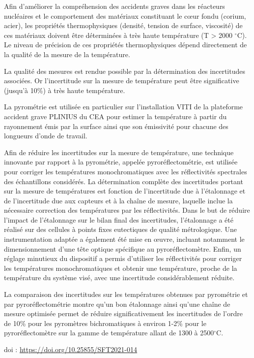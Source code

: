 {\normalsize
Afin d'améliorer la compréhension des accidents graves dans les réacteurs nucléaires et le comportement des matériaux constituant le cœur fondu (corium, acier), les propriétés thermophysiques (densité, tension de surface, viscosité) de ces matériaux doivent être déterminées à très haute température (T > 2000 $^{\circ}$C). Le niveau de précision de ces propriétés thermophysiques dépend directement de la qualité de la mesure de la température.



La qualité des mesures est rendue possible par la détermination des incertitudes associées. Or l'incertitude sur la mesure de température peut être significative (jusqu'à 10\%) à très haute température.



La pyrométrie est utilisée en particulier sur l'installation VITI de la plateforme accident grave PLINIUS du CEA pour estimer la température à partir du rayonnement émis par la surface ainsi que son émissivité pour chacune des longueurs d'onde de travail.



Afin de réduire les incertitudes sur la mesure de température, une technique innovante par rapport à la pyrométrie, appelée pyroréflectométrie, est utilisée pour corriger les températures monochromatiques avec les réflectivités spectrales des échantillons considérés. La détermination complète des incertitudes portant sur la mesure de températures est fonction de l'incertitude due à l'étalonnage et de l'incertitude due aux capteurs et à la chaîne de mesure, laquelle inclue la nécessaire correction des températures par les réflectivités. Dans le but de réduire l'impact de l'étalonnage sur le bilan final des incertitudes, l'étalonnage a été réalisé sur des cellules à points fixes eutectiques de qualité métrologique. Une instrumentation adaptée a également été mise en œuvre, incluant notamment le dimensionnement d'une tête optique spécifique au pyroréflectomètre. Enfin, un réglage minutieux du dispositif a permis d'utiliser les réflectivités pour corriger les températures monochromatiques et obtenir une température, proche de la température du système visé, avec une incertitude considérablement réduite.



La comparaison des incertitudes sur les températures obtenues par pyrométrie et par pyroréflectométrie montre qu'un bon étalonnage ainsi qu'une chaîne de mesure optimisée permet de réduire significativement les incertitudes de l'ordre de 10\% pour les pyromètres bichromatiques à environ 1-2\% pour le pyroréflectomètre sur la gamme de température allant de 1300 à 2500$^{\circ}$C.

 \vfill doi : \url{https://doi.org/10.25855/SFT2021-014}

}
 
